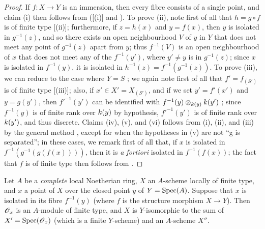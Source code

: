 \begin{proof}
If $f:X\to Y$ is an immersion, then every fibre consists of a single point, and claim (i) then follows from ([(i)] and ).
To prove (ii), note first of all that $h=g\circ f$ is of finite type [(ii)];
furthermore, if $z=h(x)$ and $y=f(x)$, then $y$ is isolated in $g^{-1}(z)$, and so there exists an open neighbourhood $V$ of $y$ in $Y$ that does not meet any point of $g^{-1}(z)$ apart from $y$;
thus $f^{-1}(V)$ is an open neighbourhood of $x$ that does not meet any of the $f^{-1}(y')$, where $y'\neq y$ is in $g^{-1}(z)$;
since $x$ is isolated in $f^{-1}(y)$, it is isolated in $h^{-1}(z)=f^{-1}(g^{-1}(z))$.
To prove (iii), we can reduce to the case where $Y=S$ ;
we again note first of all that $f'=f_{(S')}$ is of finite type [(iii)];
also, if $x'\in X'=X_{(S')}$, and if we set $y'=f'(x')$ and $y=g(y')$, then ${f'}^{-1}(y')$ can be identified with $f^{-1}(y)\otimes_{k(y)}k(y')$ ;
since $f^{-1}(y)$ is of finite rank over $k(y)$ by hypothesis, ${f'}^{-1}(y')$ is of finite rank over $k(y')$, and thus discrete.
Claims (iv), (v), and (vi) follows from (i), (ii), and (iii) by the general method , except for when the hypotheses in (v) are not ``g is separated'';
in these cases, we remark first of all that, if $x$ is isolated in $f^{-1}(g^{-1}(g(f(x))))$, then it is \emph{a fortiori} isolated in $f^{-1}(f(x))$;
the fact that $f$ is of finite type then follows from .
\end{proof}

\begin{proposition}[6.2.5]
\label{II.6.2.5}
Let $A$ be a \emph{complete} local Noetherian ring, $X$ an $A$-scheme locally of finite type, and $x$ a point of $X$ over the closed point $y$ of $Y=\operatorname{Spec}(A)$.
Suppose that $x$ is isolated in its fibre $f^{-1}(y)$ (where $f$ is the structure morphism $X\to Y$).
Then $\mathscr{O}_x$ is an $A$-module of finite type, and $X$ is $Y$-isomorphic to the sum  of $X'=\operatorname{Spec}(\mathscr{O}_x)$ (which is a finite $Y$-scheme) and an $A$-scheme $X''$.
\end{proposition}

